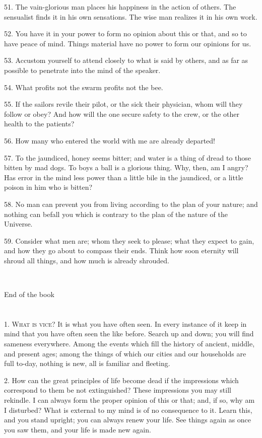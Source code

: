 \documentclass{book}
\newcommand\terminus[1]{\vspace{2em}\emph{#1} \\[2em] \begin{center}End of the \ordinalstring{chapter} book\end{center}}
\begin{document}
51. The vain-glorious man places his happiness in the action of
others. The sensualist finds it in his own sensations. The wise man
realizes it in his own work.

52. You have it in your power to form no opinion about this or that,
and so to have peace of mind. Things material have no power to form
our opinions for us.

53. Accustom yourself to attend closely to what is said by others, and
as far as possible to penetrate into the mind of the speaker.

54. What profits not the swarm profits not the bee.

\newpage

55. If the sailors revile their pilot, or the sick their physician,
whom will they follow or obey? And how will the one secure safety to
the crew, or the other health to the patients?

56. How many who entered the world with me are already departed!

57. To the jaundiced, honey seems bitter; and water is a thing of
dread to those bitten by mad dogs. To boys a ball is a glorious
thing. Why, then, am I angry? Has error in the mind less power than a
little bile in the jaundiced, or a little poison in him who is bitten?

58. No man can prevent you from living according to the plan of your
nature; and nothing can befall you which is contrary to the plan of
the nature of the Universe.

59. Consider what men are; whom they seek to please; what they expect
to gain, and how they go about to compass their ends. Think how soon
eternity will shroud all things, and how much is already shrouded.

\terminus{}

\chapter[What is vice?]{}

1. \textsc{What is vice?} It is what you have often seen. In every
instance of it keep in mind that you have often seen the like before.
Search up and down; you will find sameness everywhere. Among the events
which fill the history of ancient, middle, and present ages; among the
things of which our cities and our households are full to-day, nothing
is new, all is familiar and fleeting.

2. How can the great principles of life become dead if the impressions
which correspond to them be not extinguished? These impressions you
may still rekindle. I can always form the proper opinion of this or
that; and, if so, why am I disturbed? What is external to my mind is
of no consequence to it. Learn this, and you stand upright; you can
always renew your life. See things again as once you saw them, and
your life is made new again.
\end{document}
